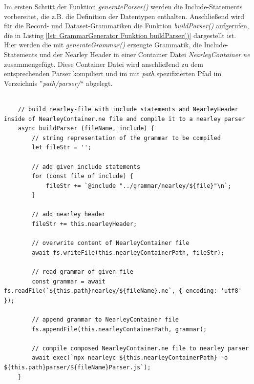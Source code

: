 Im ersten Schritt der Funktion \textit{generateParser()} werden die Include-Statements vorbereitet, die z.B. die Definition der Datentypen enthalten. Anschließend wird für die Record- und Dataset-Grammatiken die Funktion \textit{buildParser()} aufgerufen, die in Listing \ref{lst: GrammarGenerator Funktion buildParser()} dargestellt ist. Hier werden die mit \textit{generateGrammar()} erzeugte Grammatik, die Include-Statements und der Nearley Header in einer Container Datei \textit{NearleyContainer.ne} zusammengefügt. Diese Container Datei wird anschließend zu dem entsprechenden Parser kompiliert und im mit \textit{path} spezifizierten Pfad im Verzeichnis ''\textit{path/parser/}`` abgelegt.
\\ \\
\begin{minipage}{1.0\textwidth} \small
	\begin{lstlisting}
	// build nearley-file with include statements and NearleyHeader inside of NearleyContainer.ne file and compile it to a nearley parser
	async buildParser (fileName, include) {
		// string representation of the grammar to be compiled
		let fileStr = '';
		
		// add given include statements
		for (const file of include) {
			fileStr += `@include "../grammar/nearley/${file}"\n`;
		}
		
		// add nearley header
		fileStr += this.nearleyHeader;
		
		// overwrite content of NearleyContainer file
		await fs.writeFile(this.nearleyContainerPath, fileStr);
		
		// read grammar of given file
		const grammar = await fs.readFile(`${this.path}nearley/${fileName}.ne`, { encoding: 'utf8' });
		
		// append grammar to NearleyContainer file
		fs.appendFile(this.nearleyContainerPath, grammar);
		
		// compile composed NearleyContainer.ne file to nearley parser
		await exec(`npx nearleyc ${this.nearleyContainerPath} -o ${this.path}parser/${fileName}Parser.js`);
	}
	\end{lstlisting}
	\label{lst: GrammarGenerator Funktion buildParser()}
\end{minipage}
\\ \\

